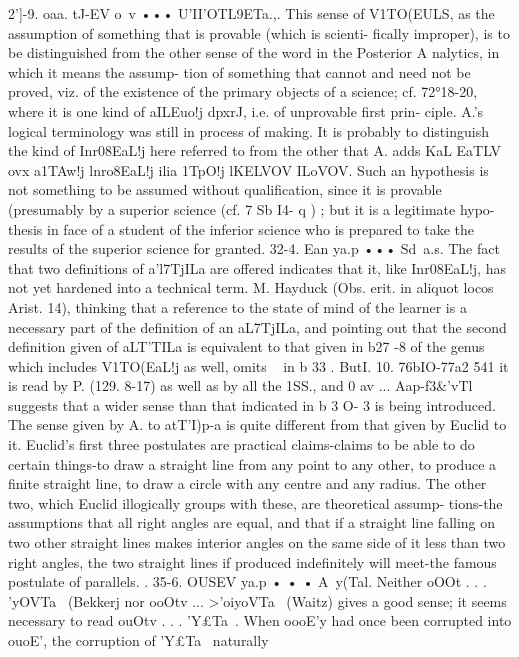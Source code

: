 {{{{{{{{{{{{{{{2']-9. oaa. tJ-EV o~v ••• U'II'OTL9ETa.,. This sense of V1TO(}EULS, as
the assumption of something that is provable (which is scienti-
fically improper), is to be distinguished from the other sense of
the word in the Posterior A nalytics, in which it means the assump-
tion of something that cannot and need not be proved, viz. of
the existence of the primary objects of a science; cf. 72°18-20,
where it is one kind of aILEuo!j dpxrJ, i.e. of unprovable first prin-
ciple. A.'s logical terminology was still in process of making.
It is probably to distinguish the kind of Inr08EaL!j here referred
to from the other that A. adds KaL EaTLV ovx a1TAw!j lnro8EaL!j ilia
1TpO!j lKELVOV ILoVOV. Such an hypothesis is not something to be
assumed without qualification, since it is provable (presumably
by a superior science (cf. 7 Sb I4- q ) ; but it is a legitimate hypo-
thesis in face of a student of the inferior science who is prepared
to take the results of the superior science for granted.
32-4. Ean ya.p ••• Sd~a.s. The fact that two definitions of
a'l7TjILa are offered indicates that it, like Inr08EaL!j, has not yet
hardened into a technical term.
M. Hayduck (Obs. erit. in aliquot locos Arist. 14), thinking that
a reference to the state of mind of the learner is a necessary part
of the definition of an aL7TjILa, and pointing out that the second
definition given of aLT'T}ILa is equivalent to that given in b27 -8
of the genus which includes V1TO(}EaL!j as well, omits ~ in b 33 . ButI.
10. 76bIO-77a2
541
it is read by P. (129. 8-17) as well as by all the 1\1SS., and 0 av
... Aap-f3&'vTl suggests that a wider sense than that indicated in
b 3 O- 3 is being introduced.
The sense given by A. to atT'I)p-a is quite different from that
given by Euclid to it. Euclid's first three postulates are practical
claims-claims to be able to do certain things-to draw a straight
line from any point to any other, to produce a finite straight line,
to draw a circle with any centre and any radius. The other two,
which Euclid illogically groups with these, are theoretical assump-
tions-the assumptions that all right angles are equal, and that
if a straight line falling on two other straight lines makes interior
angles on the same side of it less than two right angles, the two
straight lines if produced indefinitely will meet-the famous
postulate of parallels. .
35-6. OUSEV ya.p • • • A~y(Tal. Neither oOOt . . . '\£yOVTa~
(Bekkerj nor ooOtv ... >'oiyoVTa~ (Waitz) gives a good sense; it
seems necessary to read ouOtv . . . '\£Y£Ta~. When oooE'y had once
been corrupted into ouoE', the corruption of '\£Y£Ta~ naturally
}}}}}}}}}}}}
